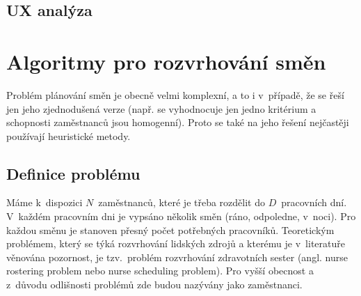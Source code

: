 \documentclass[twoside]{ctuthesis}
\begin{document}
%
%



\section{UX analýza}



\chapter{Algoritmy pro rozvrhování směn}
Problém plánování směn je obecně velmi komplexní, a to i v~případě, že se řeší jen jeho zjednodušená verze (např. se vyhodnocuje jen jedno kritérium a schopnosti zaměstnanců jsou homogenní). \cite{cai2000genetic} Proto se také na jeho řešení nejčastěji používají heuristické metody.


\section{Definice problému}
Máme k~dispozici $N$~zaměstnanců, které je třeba rozdělit do $D$~pracovních dní. V~každém pracovním dni je vypsáno několik směn (ráno, odpoledne, v~noci). Pro každou směnu je stanoven přesný počet potřebných pracovníků. Teoretickým problémem, který se týká rozvrhování lidských zdrojů a kterému je v~literatuře věnována pozornost, je tzv.~problém rozvrhování zdravotních sester (angl. nurse rostering problem nebo nurse scheduling problem). Pro vyšší obecnost a z~důvodu odlišnosti problémů zde budou  nazývány jako zaměstnanci.
\end{document}
